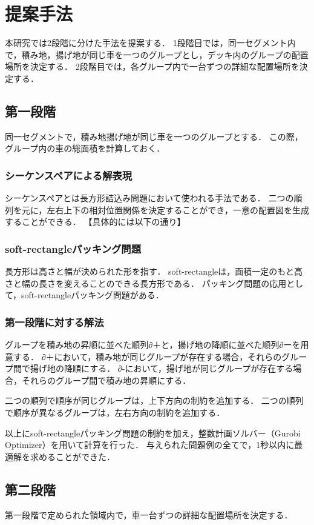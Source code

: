 \chapter{提案手法}\label{method}
本研究では2段階に分けた手法を提案する．
1段階目では，同一セグメント内で，積み地，揚げ地が同じ車を一つのグループとし，デッキ内のグループの配置場所を決定する．
2段階目では，各グループ内で一台ずつの詳細な配置場所を決定する．


\section{第一段階}
同一セグメントで，積み地揚げ地が同じ車を一つのグループとする．
この際，グループ内の車の総面積を計算しておく．

\subsection{シーケンスペアによる解表現}
シーケンスペアとは長方形詰込み問題において使われる手法である．
二つの順列を元に，左右上下の相対位置関係を決定することができ，一意の配置図を生成することができる．
【具体的には以下の通り】

\subsection{soft-rectangleパッキング問題}
長方形は高さと幅が決められた形を指す．
soft-rectangleは，面積一定のもと高さと幅の長さを変えることのできる長方形である．
パッキング問題の応用として，soft-rectangleパッキング問題がある．

\subsection{第一段階に対する解法}
グループを積み地の昇順に並べた順列∂＋と，揚げ地の降順に並べた順列∂ーを用意する．
∂＋において，積み地が同じグループが存在する場合，それらのグループ間で揚げ地の降順にする．
∂-において，揚げ地が同じグループが存在する場合，それらのグループ間で積み地の昇順にする．

二つの順列で順序が同じグループは，上下方向の制約を追加する．
二つの順列で順序が異なるグループは，左右方向の制約を追加する．

以上にsoft-rectangleパッキング問題の制約を加え，整数計画ソルバー（Gurobi Optimizer）を用いて計算を行った．
与えられた問題例の全てで，1秒以内に最適解を求めることができた．


\section{第二段階}
第一段階で定められた領域内で，車一台ずつの詳細な配置場所を決定する．

